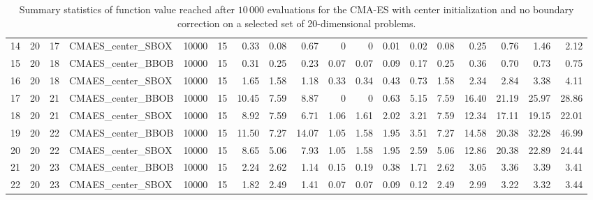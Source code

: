 \begin{table*}[!t]
\begin{tabular}{rrrlrrrrrrrrrrrrrr}
  14 & 20 & 17 & CMAES\_center\_SBOX & 10000 &  15 & 0.33 & 0.08 & 0.67 & 0 & 0 & 0.01 & 0.02 & 0.08 & 0.25 & 0.76 & 1.46 & 2.12 \\ 
  15 & 20 & 18 & CMAES\_center\_BBOB & 10000 &  15 & 0.31 & 0.25 & 0.23 & 0.07 & 0.07 & 0.09 & 0.17 & 0.25 & 0.36 & 0.70 & 0.73 & 0.75 \\ 
  16 & 20 & 18 & CMAES\_center\_SBOX & 10000 &  15 & 1.65 & 1.58 & 1.18 & 0.33 & 0.34 & 0.43 & 0.73 & 1.58 & 2.34 & 2.84 & 3.38 & 4.11 \\ 
  17 & 20 & 21 & CMAES\_center\_BBOB & 10000 &  15 & 10.45 & 7.59 & 8.87 & 0 & 0 & 0.63 & 5.15 & 7.59 & 16.40 & 21.19 & 25.97 & 28.86 \\ 
  18 & 20 & 21 & CMAES\_center\_SBOX & 10000 &  15 & 8.92 & 7.59 & 6.71 & 1.06 & 1.61 & 2.02 & 3.21 & 7.59 & 12.34 & 17.11 & 19.15 & 22.01 \\ 
  19 & 20 & 22 & CMAES\_center\_BBOB & 10000 &  15 & 11.50 & 7.27 & 14.07 & 1.05 & 1.58 & 1.95 & 3.51 & 7.27 & 14.58 & 20.38 & 32.28 & 46.99 \\ 
  20 & 20 & 22 & CMAES\_center\_SBOX & 10000 &  15 & 8.65 & 5.06 & 7.93 & 1.05 & 1.58 & 1.95 & 2.59 & 5.06 & 12.86 & 20.38 & 22.89 & 24.44 \\ 
  21 & 20 & 23 & CMAES\_center\_BBOB & 10000 &  15 & 2.24 & 2.62 & 1.14 & 0.15 & 0.19 & 0.38 & 1.71 & 2.62 & 3.05 & 3.36 & 3.39 & 3.41 \\ 
  22 & 20 & 23 & CMAES\_center\_SBOX & 10000 &  15 & 1.82 & 2.49 & 1.41 & 0.07 & 0.07 & 0.09 & 0.12 & 2.49 & 2.99 & 3.22 & 3.32 & 3.44 \\ 
   \hline
\end{tabular}
\caption{Summary statistics of function value reached after $10\,000$ evaluations for the CMA-ES with center initialization and no boundary correction on a selected set of 20-dimensional problems.}\label{tab:fce}
\end{table*}
